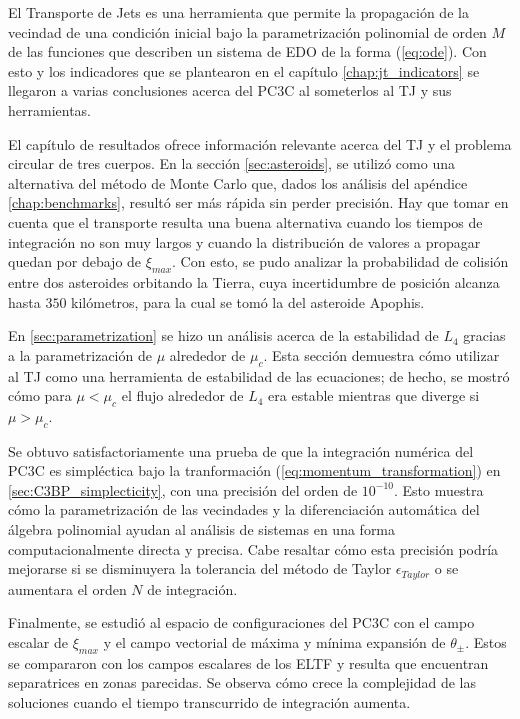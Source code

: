 El Transporte de Jets es una herramienta que permite la propagación de la vecindad de una condición inicial bajo la parametrización polinomial de orden $M$ de las funciones que describen un sistema de EDO de la forma (\ref{eq:ode}). Con esto y los indicadores que se plantearon en el capítulo \ref{chap:jt_indicators} se llegaron a varias conclusiones acerca del PC3C al someterlos al TJ y sus herramientas.

El capítulo de resultados ofrece información relevante acerca del TJ y el problema circular de tres cuerpos. En la sección \ref{sec:asteroids}, se utilizó como una alternativa del método de Monte Carlo que, dados los análisis del apéndice \ref{chap:benchmarks}, resultó ser más rápida sin perder precisión. Hay que tomar en cuenta que el transporte resulta una buena alternativa cuando los tiempos de integración no son muy largos y cuando la distribución de valores a propagar quedan por debajo de $\xi_{max}$. Con esto, se pudo analizar la probabilidad de colisión entre dos asteroides orbitando la Tierra, cuya incertidumbre de posición alcanza hasta $350$ kilómetros, para la cual se tomó la del asteroide Apophis. 

En \ref{sec:parametrization} se hizo un análisis acerca de la estabilidad de $L_4$ gracias a la parametrización de $\mu$ alrededor de $\mu_c$. Esta sección demuestra cómo utilizar al TJ como una herramienta de estabilidad de las ecuaciones; de hecho, se mostró cómo para $\mu < \mu_c$ el flujo alrededor de $L_4$ era estable mientras que diverge si $\mu > \mu_c$. 

Se obtuvo satisfactoriamente una prueba de que la integración numérica del PC3C es simpléctica bajo la tranformación (\ref{eq:momentum_transformation}) en \ref{sec:C3BP_simplecticity}, con una precisión del orden de $10^{-10}$. Esto muestra cómo la parametrización de las vecindades y la diferenciación automática del álgebra polinomial ayudan al análisis de sistemas en una forma computacionalmente directa y precisa. Cabe resaltar cómo esta precisión podría mejorarse si se disminuyera la tolerancia del método de Taylor $\epsilon_{Taylor}$ o se aumentara el orden $N$ de integración.

Finalmente, se estudió al espacio de configuraciones del PC3C con el campo escalar de $\xi_{max}$ y el campo vectorial de máxima y mínima expansión de $\theta_{\pm}$. Estos se compararon con los campos escalares de los ELTF y resulta que encuentran separatrices en zonas parecidas. Se observa cómo crece la complejidad de las soluciones cuando el tiempo transcurrido de integración aumenta.

